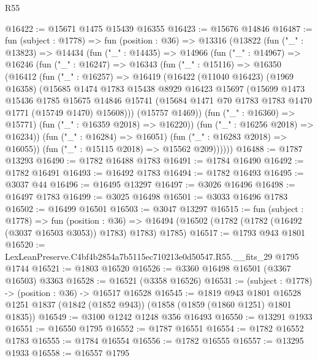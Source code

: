 \begin{lexlean}{R55}
\begin{coremodule}
@16422 := @15671 @1475 @15439 @16355
@16423 := @15676 @14846
@16487 := fun (subject : @1778) =>
  fun (position : @36) =>
  @13316
    (@13822
      (fun ("_" : @13823) =>
      @14434
        (fun ("_" : @14435) =>
        @14966
          (fun ("_" : @14967) =>
          @16246
            (fun ("_" : @16247) =>
            @16343
              (fun ("_" : @15116) =>
              @16350
                (@16412
                  (fun ("_" : @16257) =>
                  @16419
                    (@16422
                      (@11040 @16423)
                      (@1969 @16358)
                      (@15685
                        @1474
                        @1783
                        @15438
                        @8929
                        @16423
                        @15697
                        (@15699
                          @1473
                          @15436
                          @1785
                          @15675
                          @14846
                          @15741
                          (@15684 @1471 @70 @1783 @1783 @1470 @1771 (@15749 @1470) @15608)))
                      (@15757 @1469))
                    (fun ("_" : @16360) => @15771)
                    (fun ("_" : @16359 @2018) => @16220))
                  (fun ("_" : @16256 @2018) => @16234))
                (fun ("_" : @16284) => @16051)
                (fun ("_" : @16283 @2018) => @16055))
              (fun ("_" : @15115 @2018) => @15562 @209))))))
@16488 := @1787 @13293
@16490 := @1782 @16488 @1783
@16491 := @1784 @16490
@16492 := @1782 @16491
@16493 := @16492 @1783
@16494 := @1782 @16493
@16495 := @3037 @44
@16496 := @16495 @13297
@16497 := @3026 @16496
@16498 := @16497 @1783
@16499 := @3025 @16498
@16501 := @3033 @16496 @1783
@16502 := @16499 @16501
@16503 := @3047 @13297
@16515 := fun (subject : @1778) =>
  fun (position : @36) =>
  @16494 (@16502 (@1782 (@1782 (@16492 (@3037 @16503 @3053)) @1783) @1783) @1785)
@16517 := @1793 @943 @1801
@16520 := LexLeanPreserve.C4bf4b2854a7b5115ec710213e0d50547.R55.__fits_29 @1795 @1744
@16521 := @1803 @16520
@16526 := @3360 @16498 @16501 (@3367 @16503) @3363
@16528 := @16521 (@3358 @16526)
@16531 := (subject : @1778) -> (position : @36) -> @16517 @16528
@16545 := @1819
    @943
    @1801
    @16528
    @1251
    @1837
    (@1842 (@1852 @943))
    (@1858 (@1859 (@1860 @1251) @1801 @1835))
@16549 := @3100 @1242 @1248 @356 @16493
@16550 := @13291 @1933
@16551 := @16550 @1795
@16552 := @1787 @16551
@16554 := @1782 @16552 @1783
@16555 := @1784 @16554
@16556 := @1782 @16555
@16557 := @13295 @1933
@16558 := @16557 @1795

\end{coremodule}
\end{lexlean}
